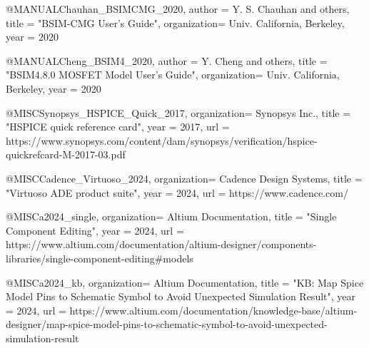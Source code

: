\documentclass[conference]{IEEEtran}
\begin{document}
@MANUAL{Chauhan_BSIMCMG_2020,
    author      =   {Y. S. {Chauhan} and others},
    title       =   "{BSIM-CMG User's Guide}",
    organization=   {Univ. California, Berkeley},
    year        =   {2020}
}

@MANUAL{Cheng_BSIM4_2020,
    author      =   {Y. {Cheng} and others},
    title       =   "{BSIM4.8.0 {MOSFET} Model User's Guide}",
    organization=   {Univ. California, Berkeley},
    year        =   {2020}
}

@MISC{Synopsys_HSPICE_Quick_2017,
    organization=   {Synopsys Inc.},
    title       =   "{HSPICE quick reference card}",
    year        =   {2017},
    url         =   {https://www.synopsys.com/content/dam/synopsys/verification/hspice-quickrefcard-M-2017-03.pdf}
}

@MISC{Cadence_Virtuoso_2024,
    organization=   {Cadence Design Systems},
    title       =   "{Virtuoso {ADE} product suite}",
    year        =   {2024},
    url         =   {https://www.cadence.com/}
}

@MISC{a2024_single,
    organization=   {Altium Documentation},
    title       =   "{Single Component Editing}",
    year        =   {2024},
    url         =   {https://www.altium.com/documentation/altium-designer/components-libraries/single-component-editing#models}
}

@MISC{a2024_kb,
    organization=   {Altium Documentation},
    title       =   "{KB: Map Spice Model Pins to Schematic Symbol to Avoid Unexpected Simulation Result}",
    year        =   {2024},
    url         =   {https://www.altium.com/documentation/knowledge-base/altium-designer/map-spice-model-pins-to-schematic-symbol-to-avoid-unexpected-simulation-result}
}
\end{document}
